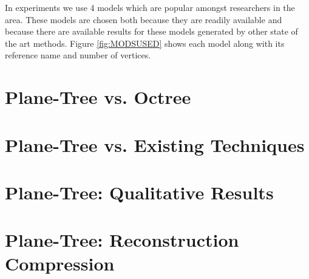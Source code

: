 In experiments we use 4 models which are popular amongst researchers in the area. These models are chosen both because they are readily available and because there are available results for these models generated by other state of the art methods. Figure \ref{fig:MODSUSED} shows each model along with its reference name and number of vertices. \\

\section{Plane-Tree vs. Octree}

\section{Plane-Tree vs. Existing Techniques}

\section{Plane-Tree: Qualitative Results}

\section{Plane-Tree: Reconstruction Compression}




